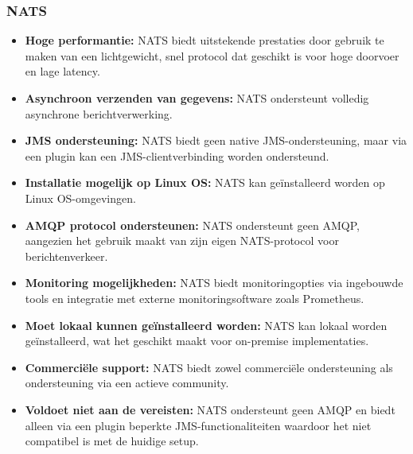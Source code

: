 \subsubsection{NATS}
\begin{itemize}
    \item \textbf{Hoge performantie:} NATS biedt uitstekende prestaties door gebruik te maken van een lichtgewicht, snel protocol dat geschikt is voor hoge doorvoer en lage latency.
    \item \textbf{Asynchroon verzenden van gegevens:} NATS ondersteunt volledig asynchrone berichtverwerking.
    \item \textbf{JMS ondersteuning:} NATS biedt geen native JMS-ondersteuning, maar via een plugin kan een JMS-clientverbinding worden ondersteund.
    \item \textbf{Installatie mogelijk op Linux OS:} NATS kan geïnstalleerd worden op Linux OS-omgevingen.
    \item \textbf{AMQP protocol ondersteunen:} NATS ondersteunt geen AMQP, aangezien het gebruik maakt van zijn eigen NATS-protocol voor berichtenverkeer.
    \item \textbf{Monitoring mogelijkheden:} NATS biedt monitoringopties via ingebouwde tools en integratie met externe monitoringsoftware zoals Prometheus.
    \item \textbf{Moet lokaal kunnen geïnstalleerd worden:} NATS kan lokaal worden geïnstalleerd, wat het geschikt maakt voor on-premise implementaties.
    \item \textbf{Commerciële support:} NATS biedt zowel commerciële ondersteuning als ondersteuning via een actieve community.
    \item \textbf{Voldoet niet aan de vereisten:} NATS ondersteunt geen AMQP en biedt alleen via een plugin beperkte JMS-functionaliteiten waardoor het niet compatibel is met de huidige setup.
\end{itemize}

  
